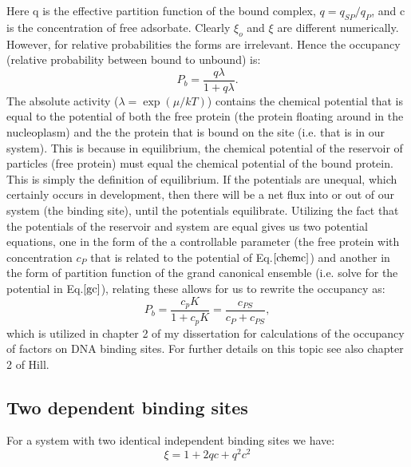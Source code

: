 Here q is the effective partition function of the bound complex, $q= q_{SP}/q_P$, and c is the concentration of free adsorbate.  Clearly $\xi_o$ and $\xi$ are different numerically.  However, for relative probabilities the forms are irrelevant.  Hence the occupancy (relative probability between bound to unbound) is:
\begin{equation}\label{gc}
P_b = \frac{q\lambda}{1+q\lambda}.
\end{equation}
The absolute activity ($\lambda=\exp( \mu /kT)$) contains the chemical potential that is equal to the potential of both the free protein (the protein floating around in the nucleoplasm) and the the protein that is bound on the site (i.e. that is in our system).   This is because in equilibrium, the chemical potential of the reservoir of particles (free protein) must equal the chemical potential of the bound protein.  This is simply the definition of equilibrium.  If the potentials are unequal, which certainly occurs in development, then there will be a net flux into or out of our system (the binding site), until the potentials equilibrate.  Utilizing the fact that the potentials of the reservoir and system are equal gives us two potential equations, one in the form of the a controllable parameter (the free protein with concentration $c_P$ that is related to the potential of Eq.$\ref{chemc}$) and another in the form of partition function of the grand canonical ensemble (i.e. solve for the potential in Eq.$\ref{gc}$), relating these allows for us to rewrite the occupancy as:
\begin{equation}
P_b = \frac{c_pK}{1+c_pK} = \frac{c_{PS}}{c_P + c_{PS}},
\end{equation}
which is utilized in chapter 2 of my dissertation for calculations of the occupancy of factors on DNA binding sites.  For further details on this topic see also chapter 2 of Hill\cite{hill}. 

\subsection{Two dependent binding sites}
 For a system with two identical independent binding sites we have:
\begin{equation}\label{}
  \xi = 1 + 2qc + q^2 c^2
\end{equation}

